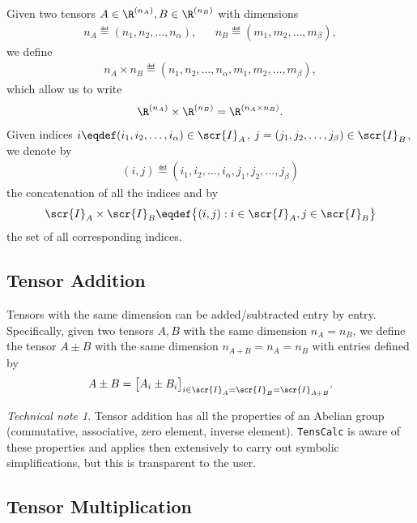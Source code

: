 \documentclass[11pt]{article}
\newcommand{\TC}{\texttt{TensCalc}}
\theoremstyle{remark}
\newtheorem{technical}{Technical note}
\begin{document}
\medskip

Given two tensors $A\in\R^{(n_A)}, B\in\R^{(n_B)}$ with dimensions
\begin{align*}
  &n_A\eqdef(n_1,n_2,\dots,n_\alpha), &
  &n_B\eqdef(m_1,m_2,\dots,m_\beta), &
\end{align*}
we define
\begin{align*}
  n_A\times n_B \eqdef(n_1,n_2,\dots,n_\alpha,m_1,m_2,\dots,m_\beta),
\end{align*}
which allow us to write
\begin{align*}
  \R^{(n_A)}\times \R^{(n_B)}=\R^{(n_A\times n_B)}.
\end{align*}
Given indices $i\eqdef(i_1,i_2,\dots,i_\alpha)\in\scr{I}_A$,
$j=(j_1,j_2,\dots,j_\beta)\in\scr{I}_B$, we denote by
\begin{align*}
  (i,j)\eqdef(i_1,i_2,\dots,i_\alpha,j_1,j_2,\dots,j_\beta)
\end{align*}
the concatenation of all the indices and by
\begin{align*}
  \scr{I}_A\times\scr{I}_B\eqdef\big\{(i,j):i\in\scr{I}_A,j\in\scr{I}_B\big\}
\end{align*}
the set of all corresponding indices. 

\subsection{Tensor Addition}

Tensors with the same dimension can be added/subtracted entry by
entry. Specifically, given two tensors $A,B$ with the same dimension
$n_A=n_B$, we define the tensor $A\pm B$ with the same dimension
$n_{A+B}=n_A=n_B$ with entries defined by
\begin{align*}
  A\pm B = \big[ A_i\pm B_i\big]_{i\in\scr{I}_A=\scr{I}_B=\scr{I}_{A+B}}.
\end{align*}

\begin{technical}
  Tensor addition has all the properties of an Abelian group
  (commutative, associative, zero element, inverse element).  \TC{} is
  aware of these properties and applies then extensively to carry out
  symbolic simplifications, but this is transparent to the user.
  \frqed
\end{technical}

\subsection{Tensor Multiplication}
\end{document}

